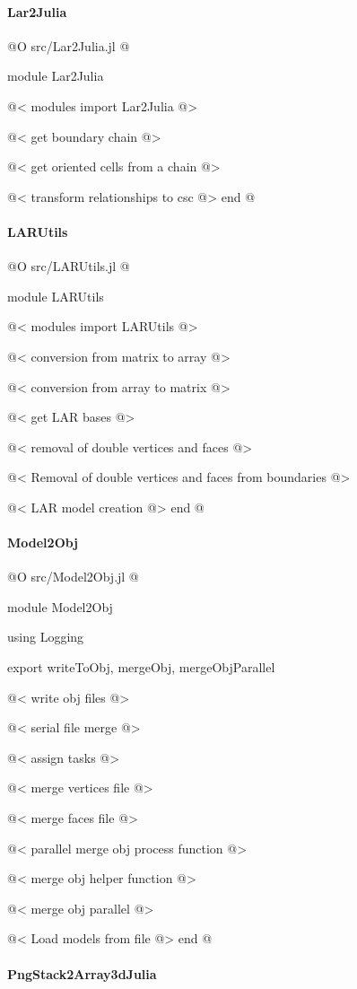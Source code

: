 \documentclass[11pt,oneside]{article}	%
\begin{document}
\paragraph{Lar2Julia}

@O src/Lar2Julia.jl
@{module Lar2Julia

@< modules import Lar2Julia @>

@< get boundary chain @>

@< get oriented cells from a chain @>

@< transform relationships to csc @>
end
@}

\paragraph{LARUtils}

@O src/LARUtils.jl
@{module LARUtils

@< modules import LARUtils @>

@< conversion from matrix to array @>

@< conversion from array to matrix @>

@< get LAR bases @>

@< removal of double vertices and faces @>

@< Removal of double vertices and faces from boundaries @>

@< LAR model creation @>
end
@}

\paragraph{Model2Obj}

@O src/Model2Obj.jl
@{module Model2Obj

using Logging

export writeToObj, mergeObj, mergeObjParallel

@< write obj files @>

@< serial file merge @>

@< assign tasks @>

@< merge vertices file @>

@< merge faces file @>

@< parallel merge obj process function @>

@< merge obj helper function @>

@< merge obj parallel @>

@< Load models from file @>
end
@}

\paragraph{PngStack2Array3dJulia}
\end{document}
